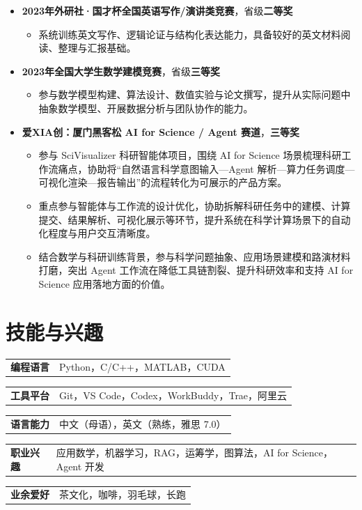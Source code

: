 \documentclass[letterpaper,11pt]{ctexart}
\makeatletter
\newcommand{\skillItem}[2]{
    \noindent
    \begin{tabular*}{\textwidth}{@{}p{2.4cm}@{\extracolsep{\fill}}p{14.3cm}@{}}
        \textbf{#1} & #2
    \end{tabular*}
    \vspace{1pt}
}
\makeatother
\begin{document}
\begin{itemize}
    \item \textbf{2023年外研社·国才杯全国英语写作/演讲类竞赛}，省级\textbf{二等奖}
    \begin{itemize}
        \item 系统训练英文写作、逻辑论证与结构化表达能力，具备较好的英文材料阅读、整理与汇报基础。
    \end{itemize}

    \item \textbf{2023年全国大学生数学建模竞赛}，省级\textbf{三等奖}
    \begin{itemize}
        \item 参与数学模型构建、算法设计、数值实验与论文撰写，提升从实际问题中抽象数学模型、开展数据分析与团队协作的能力。
    \end{itemize}

    \item \textbf{爱XIA创：厦门黑客松 AI for Science / Agent 赛道}，\textbf{三等奖}
    \begin{itemize}
    \item 参与 SciVisualizer 科研智能体项目，围绕 AI for Science 场景梳理科研工作流痛点，协助将“自然语言科学意图输入—Agent 解析—算力任务调度—可视化渲染—报告输出”的流程转化为可展示的产品方案。
    \item 重点参与智能体与工作流的设计优化，协助拆解科研任务中的建模、计算提交、结果解析、可视化展示等环节，提升系统在科学计算场景下的自动化程度与用户交互清晰度。
    \item 结合数学与科研训练背景，参与科学问题抽象、应用场景建模和路演材料打磨，突出 Agent 工作流在降低工具链割裂、提升科研效率和支持 AI for Science 应用落地方面的价值。
    \end{itemize}

\end{itemize}



\section{技能与兴趣}

\skillItem{编程语言}{Python，C/C++，MATLAB，CUDA}
\skillItem{工具平台}{Git，VS Code，Codex，WorkBuddy，Trae，阿里云}
\skillItem{语言能力}{中文（母语），英文（熟练，雅思 7.0）}
\skillItem{职业兴趣}{应用数学，机器学习，RAG，运筹学，图算法，AI for Science，Agent 开发}
\skillItem{业余爱好}{茶文化，咖啡，羽毛球，长跑}
\end{document}
